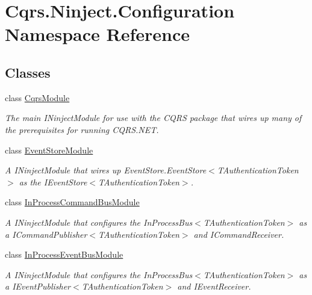 \hypertarget{namespaceCqrs_1_1Ninject_1_1Configuration}{}\section{Cqrs.\+Ninject.\+Configuration Namespace Reference}
\label{namespaceCqrs_1_1Ninject_1_1Configuration}
\subsection*{Classes}
\begin{DoxyCompactItemize}
\item 
class \hyperlink{classCqrs_1_1Ninject_1_1Configuration_1_1CqrsModule}{Cqrs\+Module}
\begin{DoxyCompactList}\small\item\em The main I\+Ninject\+Module for use with the C\+Q\+RS package that wires up many of the prerequisites for running C\+Q\+R\+S.\+N\+ET. \end{DoxyCompactList}\item 
class \hyperlink{classCqrs_1_1Ninject_1_1Configuration_1_1EventStoreModule}{Event\+Store\+Module}
\begin{DoxyCompactList}\small\item\em A I\+Ninject\+Module that wires up Event\+Store.\+Event\+Store$<$\+T\+Authentication\+Token$>$ as the I\+Event\+Store$<$\+T\+Authentication\+Token$>$. \end{DoxyCompactList}\item 
class \hyperlink{classCqrs_1_1Ninject_1_1Configuration_1_1InProcessCommandBusModule}{In\+Process\+Command\+Bus\+Module}
\begin{DoxyCompactList}\small\item\em A I\+Ninject\+Module that configures the In\+Process\+Bus$<$\+T\+Authentication\+Token$>$ as a I\+Command\+Publisher$<$\+T\+Authentication\+Token$>$ and I\+Command\+Receiver. \end{DoxyCompactList}\item 
class \hyperlink{classCqrs_1_1Ninject_1_1Configuration_1_1InProcessEventBusModule}{In\+Process\+Event\+Bus\+Module}
\begin{DoxyCompactList}\small\item\em A I\+Ninject\+Module that configures the In\+Process\+Bus$<$\+T\+Authentication\+Token$>$ as a I\+Event\+Publisher$<$\+T\+Authentication\+Token$>$ and I\+Event\+Receiver. \end{DoxyCompactList}\item 

\end{DoxyCompactItemize}
